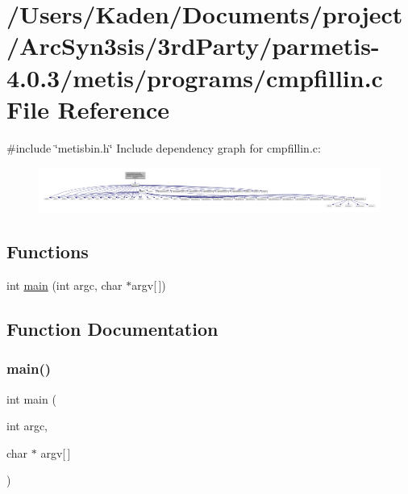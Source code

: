 \hypertarget{a00308}{}\section{/\+Users/\+Kaden/\+Documents/project/\+Arc\+Syn3sis/3rd\+Party/parmetis-\/4.0.3/metis/programs/cmpfillin.c File Reference}
\label{a00308}
{\ttfamily \#include \char`\"{}metisbin.\+h\char`\"{}}\newline
Include dependency graph for cmpfillin.\+c\+:\nopagebreak
\begin{figure}[H]
\begin{center}
\leavevmode
\includegraphics[width=350pt]{a00309}
\end{center}
\end{figure}
\subsection*{Functions}
\begin{DoxyCompactItemize}
\item 
int \hyperlink{a00308_a0ddf1224851353fc92bfbff6f499fa97}{main} (int argc, char $\ast$argv\mbox{[}$\,$\mbox{]})
\end{DoxyCompactItemize}


\subsection{Function Documentation}
\mbox{\label{a00308_a0ddf1224851353fc92bfbff6f499fa97}} 
\subsubsection{\texorpdfstring{main()}{main()}}
{\footnotesize\ttfamily int main (\begin{DoxyParamCaption}\item[{int}]{argc,  }\item[{char $\ast$}]{argv\mbox{[}$\,$\mbox{]} }\end{DoxyParamCaption})}

